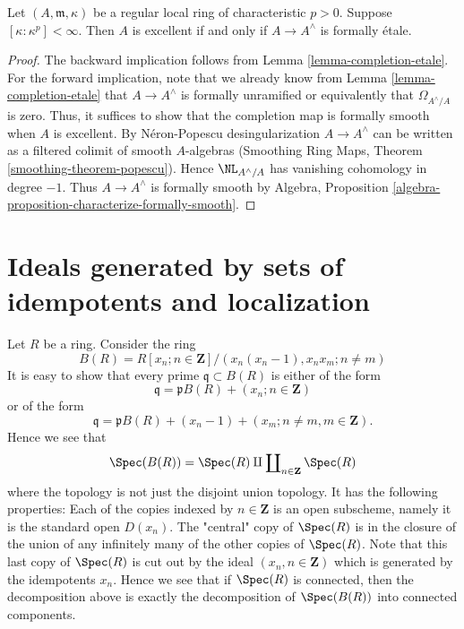\begin{lemma}
\label{lemma-excellent-regular-local-rings}
Let $(A, \mathfrak m, \kappa)$ be a regular local ring of characteristic
$p > 0$. Suppose $[\kappa : \kappa^p] < \infty$. Then $A$ is excellent
if and only if $A \to A^\wedge$ is formally \'etale.
\end{lemma}

\begin{proof}
The backward implication follows from Lemma \ref{lemma-completion-etale}.
For the forward implication, note that we already know from
Lemma \ref{lemma-completion-etale}
that $A \to A^\wedge$ is formally unramified or equivalently
that $\Omega_{A^\wedge/A}$ is zero.
Thus, it suffices to show that the completion map is formally smooth when
$A$ is excellent. By N\'eron-Popescu
desingularization $A \to A^\wedge$ can be  written as a filtered
colimit of smooth $A$-algebras
(Smoothing Ring Maps, Theorem \ref{smoothing-theorem-popescu}).
Hence $\NL_{A^\wedge/A}$ has vanishing cohomology in degree $-1$.
Thus $A \to A^\wedge$ is formally smooth by Algebra, Proposition
\ref{algebra-proposition-characterize-formally-smooth}.
\end{proof}










\section{Ideals generated by sets of idempotents and localization}
\label{section-ideal-locally-idempotents}

\noindent
Let $R$ be a ring. Consider the ring
$$
B(R) = R[x_n; n \in \mathbf{Z}]/(x_n(x_n - 1), x_nx_m; n \not = m)
$$
It is easy to show that every prime $\mathfrak q \subset B(R)$
is either of the form
$$
\mathfrak q = \mathfrak pB(R) + (x_n; n \in \mathbf{Z})
$$
or of the form
$$
\mathfrak q =
\mathfrak pB(R) + (x_n - 1) + (x_m; n \not = m, m \in \mathbf{Z}).
$$
Hence we see that
$$
\Spec(B(R)) =
\Spec(R) \amalg \coprod\nolimits_{n \in \mathbf{Z}} \Spec(R)
$$
where the topology is not just the disjoint union topology. It has the
following properties: Each of the copies indexed by $n \in \mathbf{Z}$
is an open subscheme, namely it is the standard open $D(x_n)$.
The "central" copy of $\Spec(R)$ is in the closure of the union
of any infinitely many of the other copies of $\Spec(R)$.
Note that this last copy of $\Spec(R)$ is cut out by the ideal
$(x_n, n \in \mathbf{Z})$ which is generated by the idempotents $x_n$.
Hence we see that if $\Spec(R)$ is connected,
then the decomposition above is exactly the decomposition of
$\Spec(B(R))$ into connected components.

